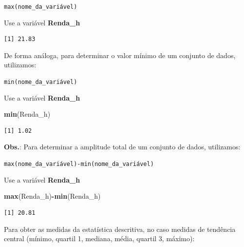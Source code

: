 \documentclass[12pt,portuguese,oneside]{book}
\newenvironment{Shaded}{\begin{snugshade}}{\end{snugshade}}
\newcommand{\KeywordTok}[1]{\textcolor[rgb]{0.13,0.29,0.53}{\textbf{#1}}}
\newcommand{\CommentTok}[1]{\textcolor[rgb]{0.56,0.35,0.01}{\textit{#1}}}
\newcommand{\OperatorTok}[1]{\textcolor[rgb]{0.81,0.36,0.00}{\textbf{#1}}}
\newcommand{\NormalTok}[1]{#1}
\begin{document}
\texttt{max(nome\_da\_variável)}

Use a variável \textbf{Renda\_h}

\begin{Shaded}
\end{Shaded}

\begin{verbatim}
[1] 21.83
\end{verbatim}

De forma análoga, para determinar o valor mínimo de um conjunto de
dados, utilizamos:

\texttt{min(nome\_da\_variável)}

Use a variável \textbf{Renda\_h}

\begin{Shaded}
\begin{Highlighting}[]
\KeywordTok{min}\NormalTok{(Renda_h)}
\end{Highlighting}
\end{Shaded}

\begin{verbatim}
[1] 1.02
\end{verbatim}

\textbf{Obs.}: Para determinar a amplitude total de um conjunto de
dados, utilizamos:

\texttt{max(nome\_da\_variável)-min(nome\_da\_variável)}

Use a variável \textbf{Renda\_h}

\begin{Shaded}
\begin{Highlighting}[]
\KeywordTok{max}\NormalTok{(Renda_h)}\OperatorTok{-}\KeywordTok{min}\NormalTok{(Renda_h)}
\end{Highlighting}
\end{Shaded}

\begin{verbatim}
[1] 20.81
\end{verbatim}

Para obter as medidas da estatística descritiva, no caso medidas de
tendência central (mínimo, quartil 1, mediana, média, quartil 3,
máximo):
\end{document}
